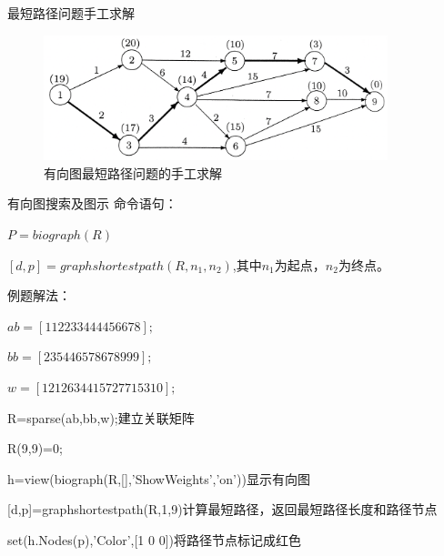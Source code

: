 \documentclass[10pt]{beamer}
\begin{document}
\begin{frame}[allowframebreaks]{最短路径问题手工求解}
\begin{figure}[htp]
  \centering
  \includegraphics[width=10cm]{74.png}
  \caption{有向图最短路径问题的手工求解}
\end{figure}

\end{frame}
\begin{frame}[allowframebreaks]{有向图搜索及图示}
命令语句：

$P=biograph(R)$

$[d,p]=graphshortestpath(R,n_1,n_2)$,其中$n_1$为起点，$n_2$为终点。

例题解法：

$ab=[1 1 2 2 3 3 4 4 4 4 5 6 6 7 8];$

$bb=[2 3 5 4 4 6 5 7 8 6 7 8 9 9 9];$

$w=[1 2 12 6 3 4 4 15 7 2 7 7 15 3 10];$

R=sparse(ab,bb,w);建立关联矩阵

R(9,9)=0;

h=view(biograph(R,[],'ShowWeights','on'))显示有向图

[d,p]=graphshortestpath(R,1,9)计算最短路径，返回最短路径长度和路径节点

set(h.Nodes(p),'Color',[1 0 0])将路径节点标记成红色

\end{frame}
\end{document}
